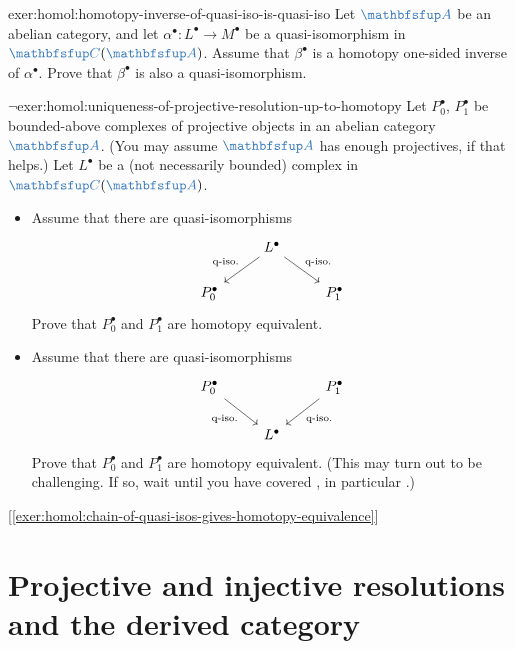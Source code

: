 \begin{exer}{}{exer:homol:homotopy-inverse-of-quasi-iso-is-quasi-iso}
  Let $\categ{A}$ be an abelian category, and let
  $\alpha^\bullet : L^\bullet \to M^\bullet$ be a quasi-isomorphism in
  $\categ{C}(\categ{A})$. Assume that $\beta^\bullet$ is a homotopy
  one-sided inverse of $\alpha^\bullet$. Prove that $\beta^\bullet$ is
  also a quasi-isomorphism.
\end{exer}
\begin{exer}{$\lnot$}{exer:homol:uniqueness-of-projective-resolution-up-to-homotopy}
  Let $P_0^\bullet$, $P_1^\bullet$ be bounded-above complexes of
  projective objects in an abelian category $\categ{A}$. (You may
  assume $\categ{A}$ has enough projectives, if that helps.) Let
  $L^\bullet$ be a (not necessarily bounded) complex in
  $\categ{C}(\categ{A})$.
  \begin{itemize}
  \item Assume that there are quasi-isomorphisms
    \[\begin{tikzcd}
        & L^\bullet \arrow[dl, "\text{q-iso.}"'] \arrow[dr, "\text{q-iso.}"] & \\
        P_0^\bullet & & P_1^\bullet
      \end{tikzcd}\] Prove that $P_0^\bullet$ and $P_1^\bullet$ are
    homotopy equivalent.
  \item Assume that there are quasi-isomorphisms
    \[\begin{tikzcd}
        P_0^\bullet \arrow[dr, "\text{q-iso.}"'] & &
        P_1^\bullet \arrow[dl, "\text{q-iso.}"] \\
        & L^\bullet &
      \end{tikzcd}\] Prove that $P_0^\bullet$ and $P_1^\bullet$ are
    homotopy equivalent. (This may turn out to be challenging. If so,
    wait until you have covered
    ,
    in particular .)
  \end{itemize}
  [\ref{exer:homol:chain-of-quasi-isos-gives-homotopy-equivalence}]
\end{exer}

\section{Projective and injective resolutions and the derived
  category}
\label{sec:homol:projective-and-injective-resolutions-and-the-derived-category}

